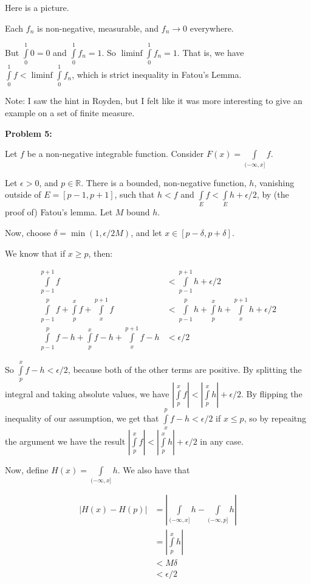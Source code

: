 \documentclass[a4paper,12pt]{article}
\newcommand{\shunt}{\vspace{20mm}}
\newcommand{\absval}[1]{\left\lvert #1 \right\rvert}
\newcommand{\de}{\delta}
\newcommand{\ep}{\epsilon}
\newcommand{\R}{\mathbb{R}}
\begin{document}
Here is a picture.

\shunt

\shunt %

Each $f_n$ is non-negative, measurable, and $f_n \to 0$ everywhere.

But $\int\limits_0^1 0 = 0$ and $\int\limits_0^1 f_n = 1$. So $\liminf\int\limits_0^1 f_n = 1$. That is, we have $\int\limits_0^1 f < \liminf\int\limits_0^1 f_n$, which is strict inequality in Fatou's Lemma.

Note: I saw the hint in Royden, but I felt like it was more interesting to give an example on a set of finite measure.

\shunt

{\bf Problem 5:}

Let $f$ be a non-negative integrable function. Consider $F(x) = \int\limits_{(-\infty,x]} f$.

Let $\ep >0$, and $p \in \R$. There is a bounded, non-negative function, $h$, vanishing outside of $E = [p-1,p+1]$, such that $h < f$ and $\int\limits_E f < \int\limits_E h+ \ep/2$, by (the proof of) Fatou's lemma. Let $M$ bound $h$.

Now, choose $\de = \min(1,\ep/2M)$, and let $x \in [p-\de,p+\de]$.

We know that if $x \geq p$, then:

\begin{align*}
\int\limits_{p-1}^{p+1} f &< \int\limits_{p-1}^{p+1} h + \ep/2\\
\int\limits_{p-1}^{p} f + \int\limits_{p}^{x} f + \int\limits_{x}^{p+1} f &< \int\limits_{p-1}^{p} h + \int\limits_{p}^{x} h + \int\limits_{x}^{p+1} h  + \ep/2\\
\int\limits_{p-1}^{p} f-h + \int\limits_{p}^{x} f-h + \int\limits_{x}^{p+1} f-h &< \ep/2
\end{align*}

So $\int\limits_p^x f-h < \ep/2$, because both of the other terms are positive. By splitting the integral and taking absolute values, we have $\absval{\int\limits_p^x f}<\absval{\int\limits_p^x h} + \ep/2$. By flipping the inequality of our assumption, we get that $\int\limits_x^p f-h < \ep/2$ if $x \leq p$, so by repeaitng the argument we have the result $\absval{\int\limits_p^x f}<\absval{\int\limits_p^x h} + \ep/2$ in any case.

Now, define $H(x) = \int\limits_{(-\infty,x]} h$. We also have that

\begin{align*}
\absval{H(x)-H(p)} &= \absval{\int\limits_{(-\infty,x]} h - \int\limits_{(-\infty,p]} h} \\
&=\absval{\int\limits_p^x h} \\
&< M \de \\
&< \ep/2
\end{align*}
\end{document}
